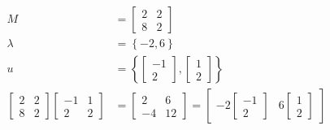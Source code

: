 \documentclass{article}
\begin{document}
\begin{equation}
    \begin{split}
        M & = \begin{bmatrix}
            2 & 2 \\ 8 & 2
        \end{bmatrix} \\
        \lambda & = \left\{ -2, 6 \right\} \\
        u & = \left\{ \begin{bmatrix}
            -1 \\ 2
        \end{bmatrix},  \begin{bmatrix}
            1 \\ 2
        \end{bmatrix} \right\} \\
        \begin{bmatrix}
            2 & 2 \\ 8 & 2
        \end{bmatrix}\begin{bmatrix}
            -1 & 1 \\ 2 & 2
        \end{bmatrix} & = \begin{bmatrix}
            2 & 6 \\ -4 & 12
        \end{bmatrix} = \begin{bmatrix}
            -2\begin{bmatrix}
            -1 \\ 2
        \end{bmatrix} & 6\begin{bmatrix}
            1 \\ 2
        \end{bmatrix}
        \end{bmatrix}
    \end{split}
\end{equation}

\clearpage
\end{document}
